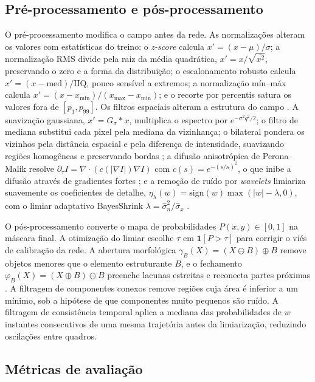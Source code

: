 \documentclass[12pt]{article}
\newcommand{\ind}{\mathbf{1}}
\begin{document}
\subsection{Pré-processamento e pós-processamento}
\label{subsec:processamento}

O pré-processamento modifica o campo antes da rede. As normalizações alteram os valores com estatísticas do treino: o \textit{z-score} calcula $x'=(x-\mu)/\sigma$; a normalização RMS divide pela raiz da média quadrática, $x'=x/\sqrt{\overline{x^2}}$, preservando o zero e a forma da distribuição; o escalonamento robusto calcula $x'=(x-\mathrm{med})/\mathrm{IIQ}$, pouco sensível a extremos; a normalização mín--máx calcula $x'=(x-x_{\min})/(x_{\max}-x_{\min})$; e o recorte por percentis satura os valores fora de $[p_1,p_{99}]$. Os filtros espaciais alteram a estrutura do campo \cite{gonzalez2018}. A suavização gaussiana, $x'=G_\sigma * x$, multiplica o espectro por $e^{-\sigma^2q^2/2}$; o filtro de mediana substitui cada pixel pela mediana da vizinhança; o bilateral pondera os vizinhos pela distância espacial e pela diferença de intensidade, suavizando regiões homogêneas e preservando bordas \cite{tomasi1998}; a difusão anisotrópica de Perona--Malik resolve $\partial_\tau I=\nabla\cdot(c(|\nabla I|)\nabla I)$ com $c(s)=e^{-(s/\kappa)^2}$, o que inibe a difusão através de gradientes fortes \cite{perona1990}; e a remoção de ruído por \textit{wavelets} limiariza suavemente os coeficientes de detalhe, $\eta_\lambda(w)=\mathrm{sign}(w)\max(|w|-\lambda,0)$, com o limiar adaptativo BayesShrink $\lambda=\hat\sigma_n^2/\hat\sigma_x$ \cite{donoho1994,chang2000,daubechies1992}.

O pós-processamento converte o mapa de probabilidades $P(x,y)\in[0,1]$ na máscara final. A otimização do limiar escolhe $\tau$ em $\ind[P>\tau]$ para corrigir o viés de calibração da rede. A abertura morfológica $\gamma_B(X)=(X\ominus B)\oplus B$ remove objetos menores que o elemento estruturante $B$, e o fechamento $\varphi_B(X)=(X\oplus B)\ominus B$ preenche lacunas estreitas e reconecta partes próximas \cite{serra1982,soille2003}. A filtragem de componentes conexos remove regiões cuja área é inferior a um mínimo, sob a hipótese de que componentes muito pequenos são ruído. A filtragem de consistência temporal aplica a mediana das probabilidades de $w$ instantes consecutivos de uma mesma trajetória antes da limiarização, reduzindo oscilações entre quadros.

\subsection{Métricas de avaliação}
\label{subsec:metricas}
\end{document}
